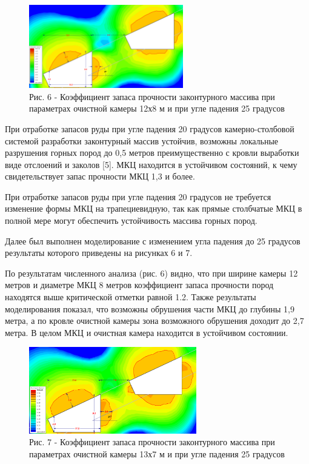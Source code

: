 \begin{figure}[H]
	\centering
	\includegraphics[width=0.6\textwidth]{assets/286}
	\caption*{Рис. 6 - Коэффициент запаса прочности законтурного массива при
параметрах очистной камеры 12х8 м и при угле падения 25 градусов}
\end{figure}

\begin{multicols}{2}
При отработке запасов руды при угле падения 20 градусов
камерно-столбовой системой разработки законтурный массив устойчив,
возможны локальные разрушения горных пород до 0,5 метров преимущественно
с кровли выработки виде отслоений и заколов {[}5{]}. МКЦ находится в
устойчивом состояний, к чему свидетельствует запас прочности МКЦ 1,3 и
более.

При отработке запасов руды при угле падения 20 градусов не требуется
изменение формы МКЦ на трапециевидную, так как прямые столбчатые МКЦ в
полной мере могут обеспечить устойчивость массива горных пород.

Далее был выполнен моделирование с изменением угла падения до 25
градусов результаты которого приведены на рисунках 6 и 7.

По результатам численного анализа (рис. 6) видно, что при ширине камеры
12 метров и диаметре МКЦ 8 метров коэффициент запаса прочности пород
находятся выше критической отметки равной 1.2. Также результаты
моделирования показал, что возможны обрушения части МКЦ до глубины 1,9
метра, а по кровле очистной камеры зона возможного обрушения доходит до
2,7 метра. В целом МКЦ и очистная камера находится в устойчивом
состоянии.
\end{multicols}

\begin{figure}[H]
	\centering
	\includegraphics[width=0.65\textwidth]{assets/287}
	\caption*{Рис. 7 - Коэффициент запаса прочности законтурного массива при
параметрах очистной камеры 13х7 м и при угле падения 25 градусов}
\end{figure}

